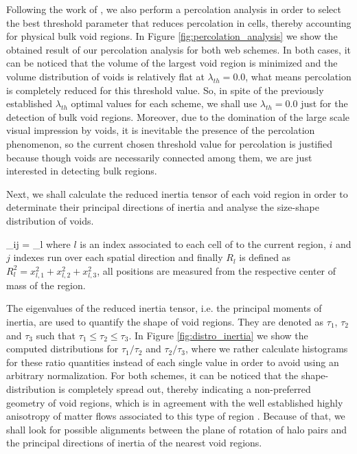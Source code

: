 \documentclass[a4,useAMS,usenatbib,usegraphicx]{latex/mn2e}
\begin{document}
Following the work of , we also perform a 
percolation analysis in order to select the best threshold parameter that
reduces percolation in cells, thereby accounting for physical bulk void 
regions. In Figure \ref{fig:percolation_analysis} we show the obtained 
result of our percolation analysis for both web schemes. In both cases, it 
can be noticed that the volume of the largest void region is minimized and 
the volume distribution of voids is relatively flat at $\lambda_{th} = 0.0$, 
what means percolation is completely reduced for this threshold value. So, 
in spite of the previously established $\lambda_{th}$ optimal values for 
each scheme, we shall use $\lambda_{th} = 0.0$ just for the detection of 
bulk void regions. Moreover, due to the domination of the large scale 
visual impression by voids, it is inevitable the presence of the 
percolation phenomenon, so the current chosen threshold value for 
percolation is justified because though voids are necessarily connected 
among them, we are just interested in detecting bulk regions.



Next, we shall calculate the reduced inertia tensor of each void region 
in order to determinate their principal directions of inertia and analyse 
the size-shape distribution of voids.


{ \tau_{ij} = \sum_l  }
where $l$ is an index associated to each cell of to the current region, 
$i$ and $j$ indexes run over each spatial direction and finally 
$R_l$ is defined as $R_l^2 = x_{l,1}^2 + x_{l,2}^2 + x_{l,3}^2$, all 
positions are measured from the respective center of mass of the region.



The eigenvalues of the reduced inertia tensor, i.e. the principal moments
of inertia, are used to quantify the shape of void regions. They are 
denoted as $\tau_1$, $\tau_2$ and $\tau_3$ such that $\tau_1 \leq \tau_2
\leq \tau_3$. In Figure \ref{fig:distro_inertia} we show the computed
distributions for $\tau_1/\tau_2$ and $\tau_2/\tau_3$, where we rather 
calculate histograms for these ratio quantities instead of each single 
value in order to avoid using an arbitrary normalization. For both schemes, 
it can be noticed that the shape-distribution is completely spread out, 
thereby indicating a non-preferred geometry of void regions, which is in 
agreement with the well established highly anisotropy of matter flows
associated to this type of region . Because of 
that, we shall look for possible alignments between the plane of rotation 
of halo pairs and the principal directions of inertia of the nearest void 
regions.
\end{document}
